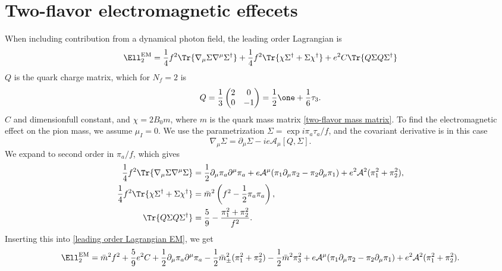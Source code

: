 \documentclass{book}
\begin{document}
\section{Two-flavor electromagnetic effecets}


When including contribution from a dynamical photon field, the leading order Lagrangian is~\autocite{eckerRoleResonancesChiral1989,urechVirtualPhotonsChiral1995}
%
\begin{equation}
    \label{leading order Lagrangian EM}
    \Ell_2^{\text{EM}}
    = 
    \frac{1}{4}f^2 
    \Tr{
        \nabla_\mu \Sigma \nabla^\mu \Sigma^\dagger
    }
    +
    \frac{1}{4}f^2 
    \Tr{
        \chi \Sigma^\dagger + \Sigma\chi^\dagger
    }
    +
    e^2 C
    \Tr{Q \Sigma Q \Sigma^\dagger}
\end{equation}
%
$Q$ is the quark charge matrix, which for $N_f = 2$ is
%
\begin{equation}
    \label{two-flavor charge matrix}
    Q
    =
    \frac{1}{3} 
    \begin{pmatrix}
        2 & 0 \\
        0 & -1
    \end{pmatrix}
    = 
    \frac{1}{2} \one + \frac{1}{6} \tau_3.
\end{equation}
%
$C$ and dimensionfull constant, and $\chi = 2B_0 m$, where $m$ is the quark mass matrix \autoref{two-flavor mass matrix}.
To find the electromagnetic effect on the pion mass, we assume $\mu_I = 0$.
We use the parametrization $\Sigma = \exp{i \pi_a \tau_a / f}$, and the covariant derivative is in this case
%
\begin{equation}
    \nabla_\mu \Sigma = \partial_\mu \Sigma - i e \mathcal A_\mu [Q, \Sigma].
\end{equation}
%
We expand to second order in $\pi_a/f$, which gives
%
\begin{align}
    \frac{1}{4}f^2 \Tr{\nabla_\mu \Sigma \nabla^\mu \Sigma}
    &=
    \frac{1}{2}\partial_\mu \pi_a\partial^\mu \pi_a
    + e \mathcal A^\mu (\pi_1 \partial_\mu \pi_2 -\pi_2 \partial_\mu \pi_1)
    + e^2 \mathcal A^2 (\pi_1^2 + \pi_2^2), \\
    \frac{1}{4}f^2 \Tr{\chi \Sigma^\dagger + \Sigma \chi^\dagger}
    & = \bar m^2\left(f^2 - \frac{1}{2} \pi_a \pi_a\right), \\
    \Tr{Q \Sigma Q \Sigma^\dagger}
    & = \frac{5}{9} - \frac{\pi_1^2 + \pi_2^2}{f^2}.
\end{align}
%
Inserting this into \autoref{leading order Lagrangian EM}, we get
%
\begin{equation}
    \Ell_2^\text{EM}
    = \bar m^2 f^2 + \frac{5}{9}e^2 C
    + \frac{1}{2}\partial_\mu \pi_a \partial^\mu \pi_a
    - \frac{1}{2} \bar m_\pm^2 (\pi_1^2 + \pi_2^2) 
    - \frac{1}{2}\bar m^2 \pi_3^2
    + e \mathcal A^\mu (\pi_1 \partial_\mu \pi_2 -\pi_2 \partial_\mu \pi_1)
    + e^2 \mathcal A^2 (\pi_1^2 + \pi_2^2).
\end{equation}
\end{document}
